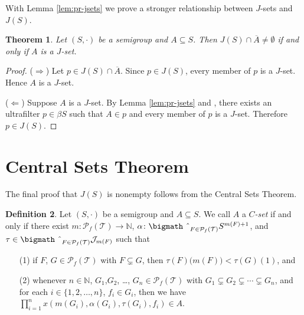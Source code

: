 \documentclass[12pt]{article}
\theoremstyle{plain}
\newtheorem{thm}{Theorem}[section]
\theoremstyle{definition}
\newtheorem{defn}[thm]{Definition}
\newcommand{\bbN}{\mathbb{N}}
\newcommand{\calJ}{\mathcal{J}}
\newcommand{\calT}{\mathcal{T}}
\newcommand{\Pf}{\mathcal{P}_f}
\newcommand{\bigtimes}{\hbox{\bigmath \char'2}}
\begin{document}
With Lemma \ref{lem:pr-jsets} we prove a stronger relationship between $J$-sets and $J(S)$.

\begin{thm}
  Let $(S, \cdot)$ be a semigroup and $A \subseteq S$.
  Then $J(S) \cap \overline{A} \ne \emptyset$ if and only if $A$ is a $J$-set.
\end{thm}
\begin{proof}
  ($\Rightarrow$)
  Let $p \in J(S) \cap \overline{A}$. 
  Since $p \in J(S)$, every member of $p$ is a $J$-set.
  Hence $A$ is a $J$-set.

  ($\Leftarrow$)
  Suppose $A$ is a $J$-set. 
  By Lemma \ref{lem:pr-jsets} and \cite[Theorem 3.11]{Hindman:1998fk}, there exists an ultrafilter $p \in \beta S$ such that $A \in p$ and every member of $p$ is a $J$-set. 
  Therefore $p \in J(S)$.
\end{proof}


\section{Central Sets Theorem}
The final proof that $J(S)$ is nonempty follows from the Central Sets Theorem.
\begin{defn}
  Let $(S, \cdot)$ be a semigroup and $A \subseteq S$.
  We call $A$ a \textsl{$C$-set} if and only if there exist $m \colon \Pf(\calT) \to \bbN$, $\alpha \colon \bigtimes_{F \in \Pf(\calT)} S^{m(F)+1}$, and $\tau \in \bigtimes_{F \in \Pf(\calT)} \calJ_{m(F)}$ such that 
  \begin{itemize}
    \item[(1)] if $F$, $G \in \Pf(\calT)$ with $F \subsetneq G$, then $\tau(F)\bigl( m(F) \bigr) < \tau(G)(1)$, and
    \item[(2)] whenever $n \in \bbN$, $G_1$,$G_2$, \dots, $G_n \in \Pf(\calT)$  with $G_1 \subsetneq G_2 \subsetneq \cdots \subsetneq G_n$, and for each $i \in \{1, 2, \ldots, n\}$, $f_i \in G_i$, then we have $\prod_{i=1}^n x(m(G_i), \alpha(G_i), \tau(G_i), f_i) \in A$.
  \end{itemize}
\end{defn}
\end{document}
